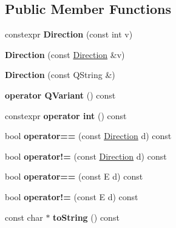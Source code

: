 \subsection*{Public Member Functions}
\begin{DoxyCompactItemize}
\item 
\mbox{\label{class_ms_1_1_direction_a0e841163cc32cf8aa99b5d1ddebfe41b}} 
constexpr {\bfseries Direction} (const int v)
\item 
\mbox{\label{class_ms_1_1_direction_a9a902208a9e2424e152426915b8d0aba}} 
{\bfseries Direction} (const \hyperlink{class_ms_1_1_direction}{Direction} \&v)
\item 
\mbox{\label{class_ms_1_1_direction_acdf15a625ff10be7400c006e4bcfcaa5}} 
{\bfseries Direction} (const Q\+String \&)
\item 
\mbox{\label{class_ms_1_1_direction_ac1fe7326a2cc2cf29cdd584124a341fc}} 
{\bfseries operator Q\+Variant} () const
\item 
\mbox{\label{class_ms_1_1_direction_a325f54870d46ec0128ce7f4ae63b84a1}} 
constexpr {\bfseries operator int} () const
\item 
\mbox{\label{class_ms_1_1_direction_ad7f854c7b5bb2fcc24202363c2c2738e}} 
bool {\bfseries operator==} (const \hyperlink{class_ms_1_1_direction}{Direction} d) const
\item 
\mbox{\label{class_ms_1_1_direction_ae94c6e862f7fd823da18545e8c2d12ea}} 
bool {\bfseries operator!=} (const \hyperlink{class_ms_1_1_direction}{Direction} d) const
\item 
\mbox{\label{class_ms_1_1_direction_ac603528a8af5049d35d848f85a16c36a}} 
bool {\bfseries operator==} (const E d) const
\item 
\mbox{\label{class_ms_1_1_direction_aa9a9b4ba7bd083d35c7bc5eb7f180b40}} 
bool {\bfseries operator!=} (const E d) const
\item 
\mbox{\label{class_ms_1_1_direction_a0612a698a2f44143648789a9cd4a24c7}} 
const char $\ast$ {\bfseries to\+String} () const
\end{DoxyCompactItemize}
